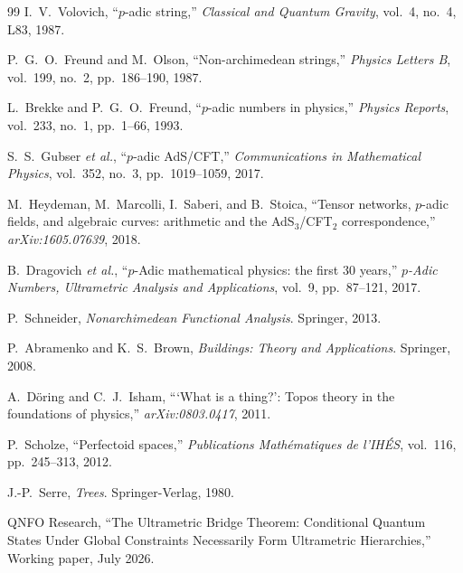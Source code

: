 \documentclass[12pt,a4paper]{article}
\theoremstyle{definition}
\begin{document}
\begin{thebibliography}{99}
I.~V.~Volovich, ``$p$-adic string,''
\emph{Classical and Quantum Gravity}, vol.~4, no.~4, L83, 1987.

P.~G.~O.~Freund and M.~Olson, ``Non-archimedean strings,''
\emph{Physics Letters B}, vol.~199, no.~2, pp.~186--190, 1987.

L.~Brekke and P.~G.~O.~Freund, ``$p$-adic numbers in physics,''
\emph{Physics Reports}, vol.~233, no.~1, pp.~1--66, 1993.

S.~S.~Gubser \emph{et al.}, ``$p$-adic AdS/CFT,''
\emph{Communications in Mathematical Physics}, vol.~352, no.~3, pp.~1019--1059, 2017.

M.~Heydeman, M.~Marcolli, I.~Saberi, and B.~Stoica, ``Tensor networks, $p$-adic fields, and algebraic curves: arithmetic and the AdS$_3$/CFT$_2$ correspondence,''
\emph{arXiv:1605.07639}, 2018.

B.~Dragovich \emph{et al.}, ``$p$-Adic mathematical physics: the first 30 years,''
\emph{$p$-Adic Numbers, Ultrametric Analysis and Applications}, vol.~9, pp.~87--121, 2017.

P.~Schneider, \emph{Nonarchimedean Functional Analysis}.
Springer, 2013.

P.~Abramenko and K.~S.~Brown, \emph{Buildings: Theory and Applications}.
Springer, 2008.

A.~D\"oring and C.~J.~Isham, ```What is a thing?': Topos theory in the foundations of physics,''
\emph{arXiv:0803.0417}, 2011.

P.~Scholze, ``Perfectoid spaces,''
\emph{Publications Math\'ematiques de l'IH\'ES}, vol.~116, pp.~245--313, 2012.

J.-P.~Serre, \emph{Trees}.
Springer-Verlag, 1980.

QNFO Research, ``The Ultrametric Bridge Theorem: Conditional Quantum States Under Global Constraints Necessarily Form Ultrametric Hierarchies,''
Working paper, July 2026.

\end{thebibliography}
\end{document}
